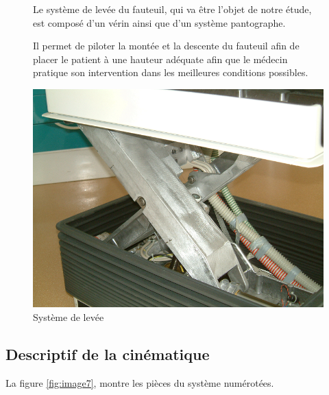 \begin{figure}[htbp]
\begin{minipage}[c]{.5\linewidth}
Le système de levée du fauteuil, qui va être l'objet de notre étude, est composé d'un vérin ainsi que d'un système pantographe.

Il permet de piloter la montée et la descente du fauteuil afin de placer le patient à une hauteur adéquate afin que le médecin pratique son intervention dans les meilleures conditions possibles.
\end{minipage}
\hfill
\begin{minipage}[c]{.45\linewidth}
\begin{center}
\includegraphics[width=\linewidth]{img/detail_chaise.png}
\caption{Système de levée}
\label{fig:image2}
\end{center}
\end{minipage}
\end{figure}

\newpage

\subsection{Descriptif de la cinématique}

La figure \ref{fig:image7}, montre les pièces du système numérotées.

